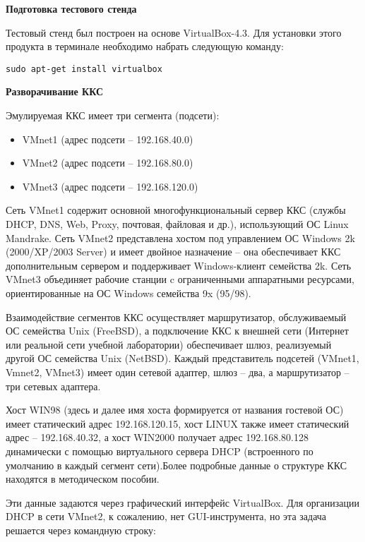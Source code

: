 \documentclass[a4paper, 12pt]{article}		%
\begin{document}



\textbf{Подготовка тестового стенда}

Тестовый стенд был построен на основе VirtualBox-4.3. Для установки этого продукта в терминале необходимо набрать следующую команду:

\begin{Verbatim}[frame=single]
sudo apt-get install virtualbox
\end{Verbatim}

\textbf{Разворачивание ККС}

Эмулируемая ККС имеет три сегмента (подсети):
\begin{itemize}
\item VMnet1 (адрес подсети – 192.168.40.0)
\item VMnet2 (адрес подсети – 192.168.80.0)
\item VMnet3 (адрес подсети – 192.168.120.0)
\end{itemize}

Сеть VMnet1 содержит основной многофункциональный сервер ККС (службы DHCP, DNS, Web, Proxy, почтовая, файловая и др.), использующий ОС Linux Mandrake. Сеть VMnet2 представлена хостом под управлением ОС Windows 2k (2000/XP/2003 Server) и имеет двойное назначение – она обеспечивает ККС дополнительным сервером и поддерживает Windows-клиент семейства 2k. Сеть VMnet3 объединяет рабочие станции c ограниченными аппаратными ресурсами, ориентированные на ОС Windows семейства 9x (95/98).

Взаимодействие сегментов ККС осуществляет маршрутизатор, обслуживаемый ОС семейства Unix (FreeBSD), а подключение ККС к внешней сети (Интернет или реальной сети учебной лаборатории) обеспечивает шлюз, реализуемый другой ОС семейства Unix (NetBSD). Каждый представитель подсетей (VMnet1, Vmnet2, VMnet3) имеет один сетевой адаптер, шлюз – два, а маршрутизатор – три сетевых адаптера.

Хост WIN98 (здесь и далее имя хоста формируется от названия гостевой ОС) имеет статический адрес 192.168.120.15, хост LINUX также имеет статический адрес – 192.168.40.32, а хост WIN2000 получает адрес 192.168.80.128 динамически с помощью виртуального сервера DHCP (встроенного по умолчанию в каждый сегмент сети).Более подробные данные о структуре ККС находятся в методическом пособии.

Эти данные задаются через графический интерфейс VirtualBox. Для организации DHCP в сети VMnet2, к сожалению, нет GUI-инструмента, но эта задача решается через командную строку:
\end{document}
